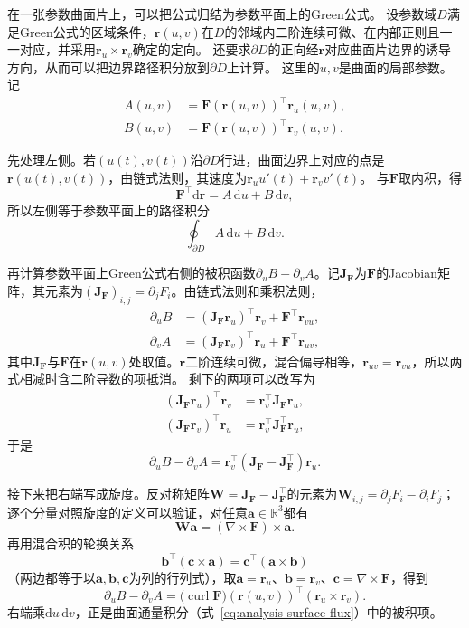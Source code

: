 在一张参数曲面片上，可以把公式归结为参数平面上的Green公式。
设参数域$D$满足Green公式的区域条件，$\bm r(u,v)$在$D$的邻域内二阶连续可微、在内部正则且一一对应，并采用$\bm r_u\times\bm r_v$确定的定向。
还要求$\partial D$的正向经$\bm r$对应曲面片边界的诱导方向，从而可以把边界路径积分放到$\partial D$上计算。
这里的$u,v$是曲面的局部参数。记
\[
 \begin{aligned}
 A(u,v)&=\bm F(\bm r(u,v))^\top\bm r_u(u,v),\\
 B(u,v)&=\bm F(\bm r(u,v))^\top\bm r_v(u,v).
 \end{aligned}
\]

先处理左侧。若$(u(t),v(t))$沿$\partial D$行进，曲面边界上对应的点是$\bm r(u(t),v(t))$，由链式法则，其速度为$\bm r_uu'(t)+\bm r_vv'(t)$。
与$\bm F$取内积，得
\[
 \bm F^\top\mathrm d\bm r=A\,\mathrm du+B\,\mathrm dv,
\]
所以左侧等于参数平面上的路径积分
\[
 \oint_{\partial D}A\,\mathrm du+B\,\mathrm dv.
\]

再计算参数平面上Green公式右侧的被积函数$\partial_uB-\partial_vA$。记$\bm J_{\bm F}$为$\bm F$的Jacobian矩阵，其元素为$(\bm J_{\bm F})_{i,j}=\partial_jF_i$。由链式法则和乘积法则，
\[
 \begin{aligned}
 \partial_uB&=(\bm J_{\bm F}\bm r_u)^\top\bm r_v+\bm F^\top\bm r_{vu},\\
 \partial_vA&=(\bm J_{\bm F}\bm r_v)^\top\bm r_u+\bm F^\top\bm r_{uv},
 \end{aligned}
\]
其中$\bm J_{\bm F}$与$\bm F$在$\bm r(u,v)$处取值。$\bm r$二阶连续可微，混合偏导相等，$\bm r_{uv}=\bm r_{vu}$，所以两式相减时含二阶导数的项抵消。
剩下的两项可以改写为
\[
 \begin{aligned}
 (\bm J_{\bm F}\bm r_u)^\top\bm r_v&=\bm r_v^\top\bm J_{\bm F}\bm r_u,\\
 (\bm J_{\bm F}\bm r_v)^\top\bm r_u&=\bm r_v^\top\bm J_{\bm F}^\top\bm r_u,
 \end{aligned}
\]
于是
\[
 \partial_uB-\partial_vA=\bm r_v^\top(\bm J_{\bm F}-\bm J_{\bm F}^\top)\bm r_u.
\]

接下来把右端写成旋度。反对称矩阵$\bm W=\bm J_{\bm F}-\bm J_{\bm F}^\top$的元素为$\bm W_{i,j}=\partial_jF_i-\partial_iF_j$；逐个分量对照旋度的定义可以验证，对任意$\bm a\in\mathbb R^3$都有
\[
 \bm W\bm a=(\nabla\times\bm F)\times\bm a.
\]
再用混合积的轮换关系
\[
 \bm b^\top(\bm c\times\bm a)=\bm c^\top(\bm a\times\bm b)
\]
（两边都等于以$\bm a,\bm b,\bm c$为列的行列式），取$\bm a=\bm r_u$、$\bm b=\bm r_v$、$\bm c=\nabla\times\bm F$，得到
\[
 \partial_uB-\partial_vA
 =\bigl(\operatorname{curl}\bm F\bigr)(\bm r(u,v))^\top
   (\bm r_u\times\bm r_v).
\]
右端乘$\mathrm du\,\mathrm dv$，正是曲面通量积分（式~\eqref{eq:analysis-surface-flux}）中的被积项。

